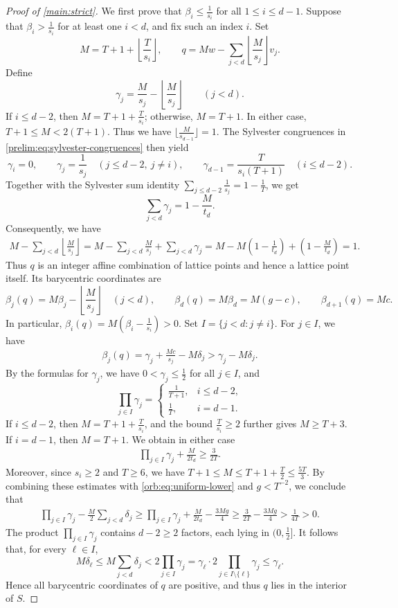 \documentclass[reqno, 11pt]{article}
\numberwithin{equation}{section}
\theoremstyle{definition}
\begin{document}
\begin{proof}[Proof of \cref{main:strict}]
We first prove that $\beta_i\le\frac{1}{s_i}$ for all $1\le i\le d-1$. Suppose that $\beta_i>\frac{1}{s_i}$ for at least one $i<d$, and fix such an index $i$. Set
\[
M=T+1+\left\lfloor\frac{T}{s_i}\right\rfloor,\qquad
q=Mw-\sum_{j<d}\left\lfloor\frac{M}{s_j}\right\rfloor v_j.
\]
Define
\[
\gamma_j=\frac{M}{s_j}-\left\lfloor\frac{M}{s_j}\right\rfloor
\qquad(j<d).
\]
If $i\le d-2$, then $M=T+1+\frac{T}{s_i}$; otherwise, $M=T+1$. In either case, $T+1\le M<2(T+1)$. Thus we have $\lfloor \frac{M}{s_{d-1}}\rfloor=1$. The Sylvester congruences in \eqref{prelim:eq:sylvester-congruences} then yield
\[
\gamma_i=0,\qquad
\gamma_j=\frac1{s_j}\quad(j\le d-2,\ j\ne i),\qquad
\gamma_{d-1}=\frac{T}{s_i(T+1)}\quad(i\le d-2).
\]
Together with the Sylvester sum identity $\sum_{j\le d-2}\frac{1}{s_j}=1-\frac{1}{T}$, we get 
\[
\sum_{j<d}\gamma_j=1-\frac{M}{t_d}.
\]
Consequently, we have
\[
\begin{aligned}
M-\sum_{j<d}\left\lfloor\frac{M}{s_j}\right\rfloor=M-\sum_{j<d}\frac{M}{s_{j}}+\sum_{j<d}\gamma_{j}=M-M\left(1-\frac1{t_d}\right)
+\left(1-\frac{M}{t_d}\right)=1.
\end{aligned}
\]
Thus $q$ is an integer affine combination of lattice points and hence a lattice point itself. Its barycentric coordinates are
\[
\beta_j(q)=M\beta_j-\left\lfloor\frac{M}{s_j}\right\rfloor
\quad(j<d),\qquad
\beta_d(q)=M\beta_d=M(g-c),\qquad
\beta_{d+1}(q)=Mc.
\]
In particular, $\beta_i(q)=M(\beta_i-\frac{1}{s_i})>0$. Set $I=\{j<d:j\ne i\}$.
For $j\in I$, we have
\begin{align}\label{eq:5.3-betawitha}
 \beta_j(q)=\gamma_j+\frac{Mc}{s_j}-M\delta_j
 >\gamma_j-M\delta_j.
\end{align}
By the formulas for $\gamma_j$, we have $0<\gamma_j\le\frac12$ for all $j\in I$, and
\[
\prod_{j\in I}\gamma_j
=
\begin{cases}
\frac{1}{T+1},&i\le d-2,\\
\frac1T,&i=d-1.
\end{cases}
\]
If $i\le d-2$, then $M=T+1+\frac{T}{s_i}$, and the bound $\frac{T}{s_i}\ge2$ further gives $M\ge T+3$. If $i=d-1$, then $M=T+1$. We obtain in either case
\begin{align}\label{eq:5.3-gammabound}
\prod_{j\in I}\gamma_j
+\frac{M}{2t_d}\ge\frac{3}{2T}.
\end{align}
Moreover, since $s_i\ge2$ and $T\ge6$, we have $T+1\le M\le T+1+\frac T2\le\frac{5T}{3}$.
By combining these estimates with \eqref{orb:eq:uniform-lower} and $g<T^{-2}$, we conclude that
\[
\begin{aligned}
\prod_{j\in I}\gamma_j
-\frac M2\sum_{j<d}\delta_j\ge
\prod_{j\in I}\gamma_j
+\frac{M}{2t_d}-\frac{3Mg}{4}
\ge\frac{3}{2T}-\frac{3Mg}{4}>\frac1{4T}>0.
\end{aligned}
\]
The product $\prod_{j\in I}\gamma_j$ contains $d-2\ge2$ factors, each lying in $(0,\frac12]$. It follows that, for every $\ell\in I$,
\[
 M\delta_\ell\le M\sum_{j<d}\delta_j
 <2\prod_{j\in I}\gamma_j=\gamma_{\ell}\cdot2\prod_{j\in I\setminus\{\ell\}}\gamma_j
 \le\gamma_\ell.
\]
Hence all barycentric coordinates of $q$ are positive, and thus $q$ lies in the interior of $S$.


\end{proof}
\end{document}
